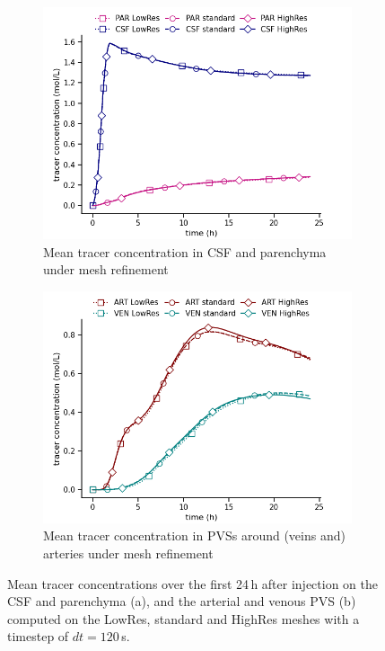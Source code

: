 \documentclass[fleqn,10pt]{wlscirep}
\begin{document}
\begin{figure}
    \centering
    \begin{subfigure}[b]{0.45\textwidth}
        \centering
        \includegraphics[width = 1 \linewidth]{figures/mesh_refinement_par_csf_mean.png}
        \caption{Mean tracer concentration in CSF and parenchyma under mesh refinement}
    \end{subfigure}
    \begin{subfigure}[b]{0.45\textwidth}
        \centering
     \includegraphics[width= 1 \linewidth]{figures/mesh_refinement_art_ven_mean.png}
         \caption{Mean tracer concentration in PVSs around (veins and) arteries  under mesh refinement}
    \end{subfigure}
    \caption{Mean tracer concentrations over the first 24\,h after injection on the CSF and parenchyma (a), and the arterial and venous PVS (b) computed on the LowRes, standard and HighRes meshes with a timestep of $dt=120$\,s.}
    \label{fig:mesh_convergence_concentrations}
\end{figure}
\end{document}
